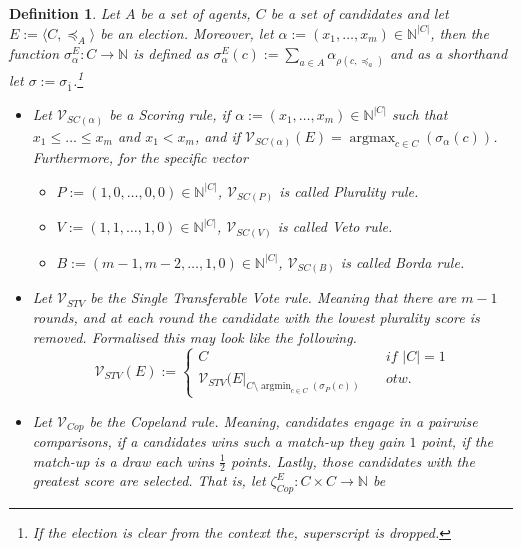 \documentclass[11pt,a4paper]{article}
\newtheorem{mydef}{Definition}
\newcommand{\pref}{\preceq}
\DeclareMathOperator*{\argmax}{argmax}
\DeclareMathOperator*{\argmin}{argmin}
\begin{document}
\begin{mydef}
\label{def:voting_rules_specific}
Let $A$ be a set of agents, $C$ be a set of candidates and let $E:=\langle C, \pref_A\rangle$ be an election. Moreover, let $\alpha:= (x_1, \dots, x_m) \in \mathbb{N}^{|C|}$, then the function $\sigma_{\alpha}^E: C \to \mathbb{N}$ is defined as $\sigma_{\alpha}^E(c):=  \sum_{a \in A} \alpha_{\rho(c,\pref_a)}$ and as a shorthand let $\sigma:=\sigma_{\overline{1}}$.\footnote{If the election is clear from the context the, superscript is dropped. } 
\begin{itemize}
\item Let $\mathcal{V}_{SC(\alpha)}$ be a \emph{Scoring rule}, if $\alpha:= (x_1, \dots, x_m) \in \mathbb{N}^{|C|}$ such that  $x_1 \leq \dots \leq x_m$ and $x_1 < x_m$, and if $\mathcal{V}_{SC(\alpha)}(E)=\argmax_{c \in C} (\sigma_{\alpha}(c))$.
Furthermore, for the specific vector 
\begin{itemize}
\item $P := (1, 0, \dots, 0, 0)\in \mathbb{N}^{|C|}$, $\mathcal{V}_{SC(P)}$ is called \emph{Plurality rule}.
\item $V := (1, 1, \dots, 1, 0)\in \mathbb{N}^{|C|}$, $\mathcal{V}_{SC(V)}$ is called \emph{Veto rule}.
\item $B := (m-1, m-2 , \dots,1, 0)\in \mathbb{N}^{|C|}$, $\mathcal{V}_{SC(B)}$ is called \emph{Borda rule}.
\end{itemize}
\item Let $\mathcal{V}_{STV}$ be the \emph{Single Transferable Vote} rule. Meaning that there are $m-1$ rounds, and at each round the candidate with the lowest plurality score is removed. Formalised this may look like the following.
\begin{equation*}
\mathcal{V}_{STV}(E):=
\begin{cases}
C & \quad \textit{if } |C|=1 \\
\mathcal{V}_{STV}(E|_{C\setminus \argmin_{c \in C} (\sigma_{P}(c))} & \quad \textit{otw.}
\end{cases}
\end{equation*}
\item Let $\mathcal{V}_{Cop}$ be the \emph{Copeland} rule. Meaning, candidates engage in a pairwise comparisons, if a candidates wins such a match-up they gain $1$ point, if the match-up is a draw each wins $\frac{1}{2}$ points. Lastly, those candidates with the greatest score are selected.
That is, let $\zeta_{Cop}^E: C \times C \to \mathbb{N}$ be 

\end{itemize}
\end{mydef}
\end{document}
